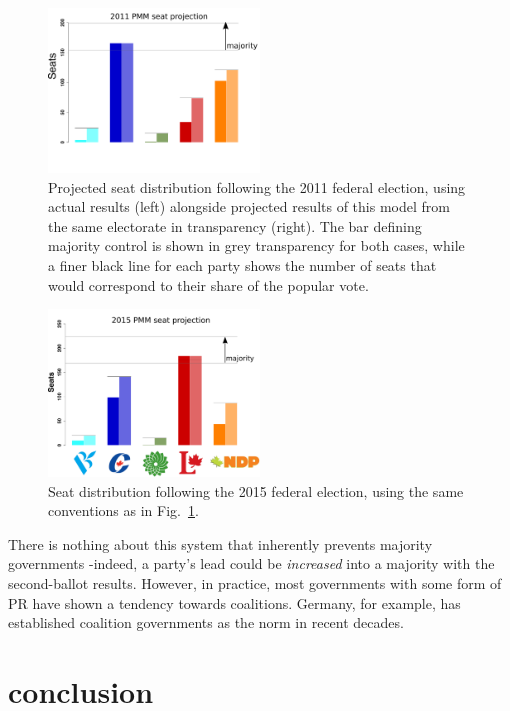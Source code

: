 \documentclass[DIV=calc, paper=a4, fontsize=11pt, twocolumn]{scrartcl}	 %
\begin{document}
\begin{figure}[h!]
  \includegraphics[width=0.50\textwidth,clip]{Figs/2011_seat_projection}
  \caption{ Projected seat distribution following the 2011 federal election, using actual results (left) alongside projected results of this model from the same electorate in transparency (right). The bar defining majority control is shown in grey transparency for both cases, while a finer black line for each party shows the number of seats that would correspond to their share of the popular vote.
}
\label{fig:hypo_2011}
\end{figure}

\begin{figure}[h!]
  \includegraphics[width=0.50\textwidth,clip]{Figs/2015_seat_projection}
  \caption{ Seat distribution following the 2015 federal election, using the same conventions as in Fig.~\ref{fig:hypo_2011}.}
\label{fig:hypo_2015}
\end{figure}

There is nothing about this system that inherently prevents majority governments \--indeed, a party's lead could be \emph{increased} into a majority with the second-ballot results. However, in practice, most governments with some form of PR have shown a tendency towards coalitions. Germany, for example, has established coalition governments as the norm in recent decades.

\section{conclusion}	
\end{document}
